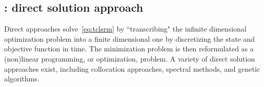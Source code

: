 \subsection{\spatialAcronym: direct solution approach}\label{sec:direct} 

Direct approaches solve~\eqref{eq:tclsrm} by
``transcribing" the infinite dimensional optimization problem into a finite
dimensional one by discretizing the state and objective function in time.
The minimization problem is then reformulated as a (non)linear programming, or
optimization, problem. A variety of direct solution approaches exist, 
including collocation approaches, spectral  methods, and genetic algorithms.  


